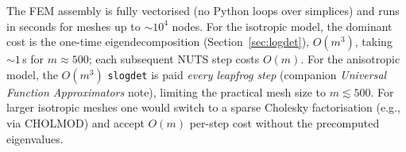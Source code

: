 \documentclass[11pt]{article}
\begin{document}
The FEM assembly is fully vectorised (no Python loops over simplices) and runs
in seconds for meshes up to $\sim 10^4$ nodes.  For the isotropic model, the
dominant cost is the one-time eigendecomposition (Section~\ref{sec:logdet}),
$O(m^3)$, taking $\sim 1$\,s for $m \approx 500$; each subsequent NUTS step
costs $O(m)$.  For the anisotropic model, the $O(m^3)$ \texttt{slogdet} is paid
\emph{every leapfrog step} (companion \emph{Universal Function Approximators}
note), limiting the practical mesh size to $m \lesssim 500$.  For larger isotropic meshes one would
switch to a sparse Cholesky factorisation (e.g., via \textsc{CHOLMOD}) and
accept $O(m)$ per-step cost without the precomputed eigenvalues.



\end{document}
